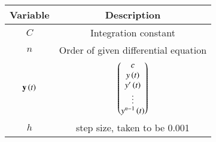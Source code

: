 \begin{tabular}[12pt]{ |c| c|}
    \hline
    \textbf{Variable} & \textbf{Description}\\ 
    \hline
    $C$ & Integration constant\\
    \hline
    $n$ & Order of given differential equation\\
    \hline
    $\mathbf{y}\left(t\right)$ & $\begin{pmatrix}c \\ y\left(t\right) \\ y^\prime\left(t\right) \\ \vdots \\ y^{n-1}\left(t\right)\end{pmatrix}$\\
    \hline
    $h$ & step size, taken to be 0.001\\
    \hline
    \end{tabular}
